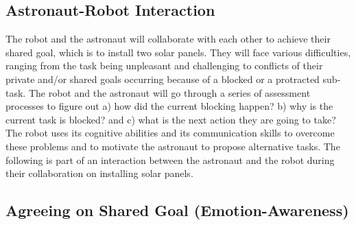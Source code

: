 \subsection{Astronaut-Robot Interaction}

The robot and the astronaut will collaborate with each other to achieve their
shared goal, which is to install two solar panels. They will face various
difficulties, ranging from the task being unpleasant and challenging to
conflicts of their private and/or shared goals occurring because of a blocked or
a protracted sub-task. The robot and the astronaut will go through a series of
assessment processes to figure out a) how did the current blocking happen? b)
why is the current task is blocked? and c) what is the next action they are
going to take? The robot uses its cognitive abilities and its communication
skills to overcome these problems and to motivate the astronaut to propose
alternative tasks. The following is part of an interaction between the astronaut
and the robot during their collaboration on installing solar panels.

\subsection{Agreeing on Shared Goal (Emotion-Awareness)}
\label{sec:exp1}

